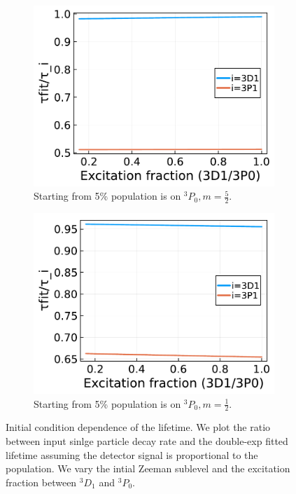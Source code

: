 \documentclass{article}
\begin{document}
\begin{figure}
    \begin{subfigure}{.49\linewidth}
        \includegraphics[width=\linewidth]{tauratio_m=2.5_S=0.95.pdf}
        \caption{Starting from 5\% population is on $^3P_0, m=\frac{5}{2}$.}
    \end{subfigure}
    \begin{subfigure}{.49\linewidth}
        \includegraphics[width=\linewidth]{tauratio_m=0.5_S=0.95.pdf}
        \caption{Starting from 5\% population is on $^3P_0, m=\frac{1}{2}$.}
    \end{subfigure}
    \caption{Initial condition dependence of the lifetime. We plot the ratio between input sinlge particle decay rate and the double-exp fitted lifetime assuming the detector signal is proportional to the population. We vary the intial Zeeman sublevel and the excitation fraction between $^3D_1$ and $^3P_0$. \label{fig:tau_extract}}
\end{figure}
\end{document}
